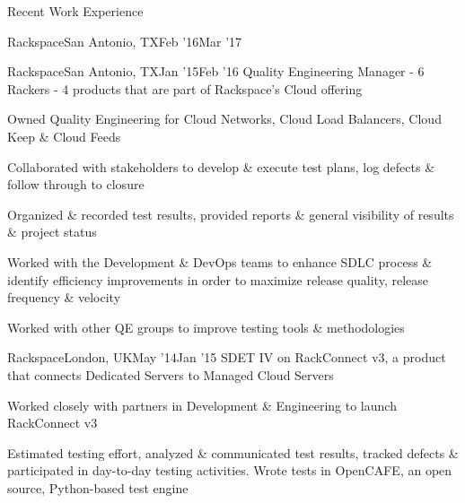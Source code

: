 \documentclass{resume} %
\begin{document}
\begin{rSection}{Recent Work Experience}
\begin{rSubsection}{Rackspace}{San Antonio, TX}{Feb '16}{Mar '17}
\end{rSubsection}
    
\begin{rSubsection}{Rackspace}{San Antonio, TX}{Jan '15}{Feb '16}
{Quality Engineering Manager - 6 Rackers - 4 products that are part of Rackspace's Cloud offering}

\item Owned Quality Engineering for Cloud Networks, Cloud Load Balancers, Cloud Keep \& Cloud Feeds
\item Collaborated with stakeholders to develop \& execute test plans, log defects \& follow through to closure
\item Organized \& recorded test results, provided reports \& general visibility of results \& project status
\item Worked with the Development \& DevOps teams to enhance SDLC process \& identify efficiency improvements in order to maximize release quality, release frequency \& velocity
\item Worked with other QE groups to improve testing tools \& methodologies

\end{rSubsection}


\begin{rSubsection}{Rackspace}{London, UK}{May '14}{Jan '15}
{SDET IV on RackConnect v3, a product that connects Dedicated Servers to Managed Cloud Servers}

\item Worked closely with partners in Development \& Engineering to launch RackConnect v3
\item Estimated testing effort, analyzed \& communicated test results, tracked defects \& participated in day-to-day testing activities. Wrote tests in OpenCAFE, an open source, Python-based test engine

\end{rSubsection}
\end{rSection}


\end{document}
